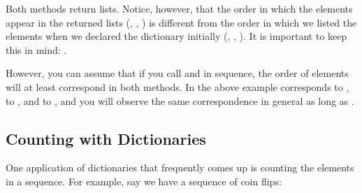 \begin{sphinxVerbatim}[commandchars=\\\{\}]
\end{sphinxVerbatim}

Both methods return lists. Notice, however, that the order in which
the elements appear in the returned lists (, ,
) is different from the order in which we listed the elements
when we declared the dictionary initially (, ,
). It is important to keep this in mind: .

However, you can assume that if you call  and 
in sequence, the order of elements will at least correspond in both
methods. In the above example  corresponds to , 
to , and  to , and you will observe
the same correspondence in general as long as .


\subsection{Counting with Dictionaries}
\label{\detokenize{lesson/prg/python_intro:counting-with-dictionaries}}
One application of dictionaries that frequently comes up is counting
the elements in a sequence. For example, say we have a sequence of
coin flips:

\begin{sphinxVerbatim}[commandchars=\\\{\}]
 
  \PYG{p}{[}\PYG{p}{[} \PYG{p}{]}    \PYG{p}{]}
\end{sphinxVerbatim}

